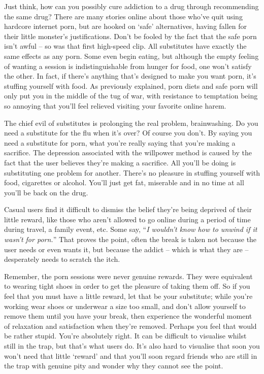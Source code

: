 \documentclass[
]{book}
\begin{document}
Just think, how can you possibly cure addiction to a drug through recommending the same drug? There are many stories online about those who've quit using hardcore internet porn, but are hooked on `safe' alternatives, having fallen for their little monster's justifications. Don't be fooled by the fact that the safe porn isn't awful -- so was that first high-speed clip. All substitutes have exactly the same effects as any porn. Some even begin eating, but although the empty feeling of wanting a session is indistinguishable from hunger for food, one won't satisfy the other. In fact, if there's anything that's designed to make you want porn, it's stuffing yourself with food. As previously explained, porn diets and safe porn will only put you in the middle of the tug of war, with resistance to temptation being so annoying that you'll feel relieved visiting your favorite online harem.

The chief evil of substitutes is prolonging the real problem, brainwashing. Do you need a substitute for the flu when it's over? Of course you don't. By saying you need a substitute for porn, what you're really saying that you're making a sacrifice. The depression associated with the willpower method is caused by the fact that the user believes they're making a sacrifice. All you'll be doing is substituting one problem for another. There's no pleasure in stuffing yourself with food, cigarettes or alcohol. You'll just get fat, miserable and in no time at all you'll be back on the drug.

Casual users find it difficult to dismiss the belief they're being deprived of their little reward, like those who aren't allowed to go online during a period of time during travel, a family event, etc. Some say, ``\emph{I wouldn't know how to unwind if it wasn't for porn.}'' That proves the point, often the break is taken not because the user needs or even wants it, but because the addict -- which is what they are -- desperately needs to scratch the itch.

Remember, the porn sessions were never genuine rewards. They were equivalent to wearing tight shoes in order to get the pleasure of taking them off. So if you feel that you must have a little reward, let that be your substitute; while you're working wear shoes or underwear a size too small, and don't allow yourself to remove them until you have your break, then experience the wonderful moment of relaxation and satisfaction when they're removed. Perhaps you feel that would be rather stupid. You're absolutely right. It can be difficult to visualise whilst still in the trap, but that's what users do. It's also hard to visualise that soon you won't need that little `reward' and that you'll soon regard friends who are still in the trap with genuine pity and wonder why they cannot see the point.
\end{document}
